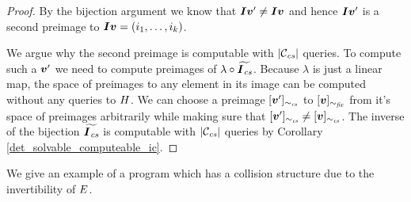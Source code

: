 \begin{proof}
    By the bijection argument we know that $\boldsymbol{I}\boldsymbol v' \neq \boldsymbol{I}\boldsymbol v$ and hence
    $\boldsymbol{I}\boldsymbol v'$ is a second preimage to $\boldsymbol{I}\boldsymbol v = (i_1, \dots, i_{k})$.
    
    We argue why the second preimage is computable with $|\mathcal{C}_\textit{cs}|$ queries.
    To compute such a $\boldsymbol v'$ we need to compute preimages of $\lambda \circ \widetilde{\boldsymbol{I}_\textit{cs}}$.
    Because $\lambda$ is just a linear map, the space of preimages to any element in its image can be computed without any queries to $H$.
    We can choose a preimage $[\boldsymbol v']_{\sim_\textit{cs}}$ to $[\boldsymbol v]_{\sim_\textit{fix}}$ from it's space of preimages arbitrarily while making sure that $[\boldsymbol v']_{\sim_\textit{cs}} \neq [\boldsymbol v]_{\sim_\textit{cs}}$.
    The inverse of the bijection $\widetilde{\boldsymbol{I}_\textit{cs}}$ is computable with $|\mathcal{C}_\textit{cs}|$ queries by Corollary \ref{det_solvable_computeable_ic}.
\end{proof}

We give an example of a program which has a collision structure due to the invertibility of $E$.

\begin{pchstack}[center, space=2cm]
\end{pchstack}

